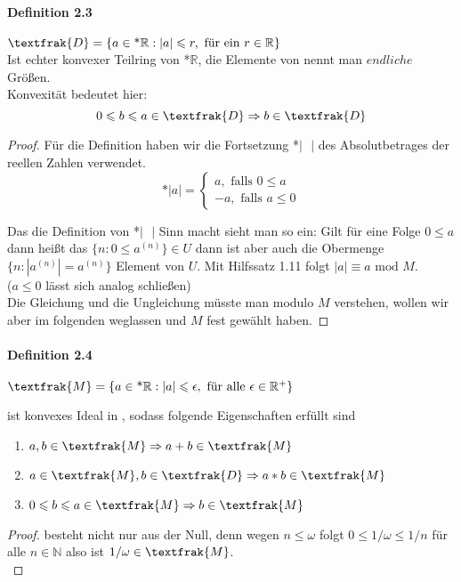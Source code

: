 \documentclass[a4paper]{article}
\begin{document}
\paragraph{Definition 2.3} $ \textfrak{D} = \{a \in \text{*}\mathbb{R}: |a| \leqslant r, \text{ für ein } r \in \mathbb{R}\} $ \\
Ist echter konvexer Teilring von *$\mathbb{R}$, die Elemente von  nennt man $ endliche $ Größen. \\
Konvexität bedeutet hier:
$$ 0 \leqslant b \leqslant a \in \textfrak{D} \Rightarrow b \in \textfrak{D} $$
\begin{proof}
      Für die Definition haben wir die Fortsetzung *$| \text{ }|$ des Absolutbetrages der reellen Zahlen verwendet. 
      $$
      \text{*}|a| = 
            \begin{cases} 
                  a, \text{ falls } 0 \leqslant a \\
                  -a, \text{ falls } a \leqslant 0
            \end{cases} 
      $$

      \smallskip
      Das die Definition von *$|\text{ }|$ Sinn macht sieht man so ein: Gilt für eine Folge $ 0 \leqslant a $ 
      dann heißt das $ \{n: 0 \leqslant a^{(n)}\} \in U $ dann ist 
      aber auch die Obermenge $ \{n: |a^{(n)}| = a^{(n)}\} $ Element von $ U $. Mit Hilfssatz 1.11 folgt
      $ |a| \equiv a \text{ mod } M $. \\
      ($a \leqslant 0 $ lässt sich analog schließen) \\

      \smallskip
      Die Gleichung und die Ungleichung müsste man modulo $ M $ verstehen, wollen wir aber im folgenden weglassen und 
      $ M $ fest gewählt haben.

\end{proof}


\paragraph{Definition 2.4} $ \textfrak{M} = \{a \in \text{*}\mathbb{R}: |a| \leqslant \epsilon, \text{ für alle } \epsilon \in \mathbb{R}^+ \} $

\bigskip
{} ist konvexes Ideal in , sodass folgende Eigenschaften erfüllt sind 
\begin{enumerate}
      \item $a,b \in \textfrak{M} \Rightarrow a + b \in \textfrak{M} $ 
      \item $a \in \textfrak{M}, b \in \textfrak{D} \Rightarrow a * b \in \textfrak{M} $ 
      \item $0 \leqslant b \leqslant a \in \textfrak{M} \Rightarrow b \in \textfrak{M} $ 
\end{enumerate}
\begin{proof}
       besteht nicht nur aus der Null, denn wegen $ n \leqslant \omega $ folgt
      $ 0 \leqslant 1/\omega \leqslant 1/n $ für alle $ n \in \mathbb{N} $ also ist $ 1/\omega \in \textfrak{M} $. \\

      \end{proof}
\end{document}
